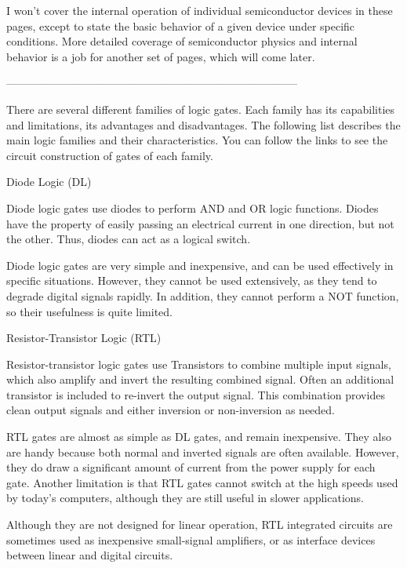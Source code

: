 I won't cover the internal operation of individual semiconductor devices in these pages, except to state the basic behavior of a given device under specific conditions. More detailed coverage of semiconductor physics and internal behavior is a job for another set of pages, which will come later.


--------------------------------------------------------------------------------

There are several different families of logic gates. Each family has its capabilities and limitations, its advantages and disadvantages. The following list describes the main logic families and their characteristics. You can follow the links to see the circuit construction of gates of each family.

Diode Logic (DL)

Diode logic gates use diodes to perform AND and OR logic functions. Diodes have the property of easily passing an electrical current in one direction, but not the other. Thus, diodes can act as a logical switch.

Diode logic gates are very simple and inexpensive, and can be used effectively in specific situations. However, they cannot be used extensively, as they tend to degrade digital signals rapidly. In addition, they cannot perform a NOT function, so their usefulness is quite limited.



Resistor-Transistor Logic (RTL)

Resistor-transistor logic gates use Transistors to combine multiple input signals, which also amplify and invert the resulting combined signal. Often an additional transistor is included to re-invert the output signal. This combination provides clean output signals and either inversion or non-inversion as needed.

RTL gates are almost as simple as DL gates, and remain inexpensive. They also are handy because both normal and inverted signals are often available. However, they do draw a significant amount of current from the power supply for each gate. Another limitation is that RTL gates cannot switch at the high speeds used by today's computers, although they are still useful in slower applications.

Although they are not designed for linear operation, RTL integrated circuits are sometimes used as inexpensive small-signal amplifiers, or as interface devices between linear and digital circuits.



